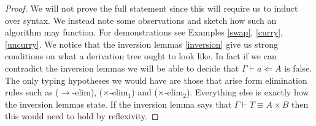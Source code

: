 \begin{proof}
    We will not prove the full statement since this will require us to induct over syntax. We instead note some observations and sketch how such an algorithm may function. For demonstrations see Examples \ref{swap}, \ref{curry}, \ref{uncurry}.
    We notice that the inversion lemmas \ref{inversion} give us strong conditions on what a derivation tree ought to look like. In fact if we can contradict the inversion lemmas we will be able to decide that $\Gamma \vdash a \Leftarrow A$ is false.
    The only typing hypotheses we would have are those that arise form elimination rules such as ($\to$-elim), ($\times$-elim${}_1$) and ($\times$-elim${}_2$). Everything else is exactly how the inversion lemmas state. If the inversion lemma says that $\Gamma \vdash T \equiv A \times B$ then this would need to hold by reflexivity.
\end{proof}


